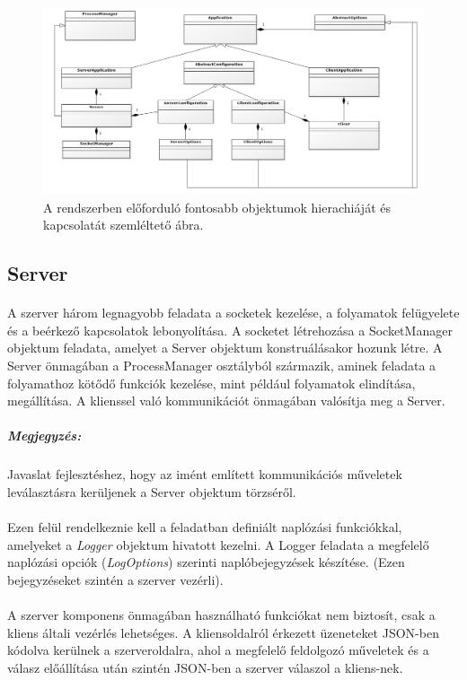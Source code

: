 \documentclass[12pt]{report}
\begin{document}
     \begin{figure}[ht]
    \includegraphics[width=16cm]{pics/classes.png}
	  \caption{A rendszerben előforduló fontosabb objektumok hierachiáját és kapcsolatát szemléltető ábra.}
  \end{figure}
\subsection{Server}
  \paragraph{}
  A szerver három legnagyobb feladata a socketek kezelése, a folyamatok felügyelete és a beérkező kapcsolatok lebonyolítása. A socketet létrehozása a SocketManager objektum feladata, amelyet a Server objektum konstruálásakor hozunk létre. A Server önmagában a ProcessManager osztályból származik, aminek feladata a folyamathoz kötődő funkciók kezelése, mint például folyamatok elindítása, megállítása. A klienssel való kommunikációt önmagában valósítja meg a Server.
  
  \subparagraph{Megjegyzés:}Javaslat fejlesztéshez, hogy az imént említett kommunikációs műveletek leválasztásra kerüljenek a Server objektum törzséről.
  \paragraph{}
Ezen felül rendelkeznie kell a feladatban definiált naplózási funkciókkal, amelyeket a \textit{Logger} objektum hivatott kezelni. A Logger feladata a megfelelő naplózási opciók (\textit{LogOptions}) szerinti naplóbejegyzések készítése. (Ezen bejegyzéseket szintén  a szerver vezérli).

\paragraph{}
  A szerver komponens önmagában használható funkciókat nem biztosít, csak a kliens általi vezérlés lehetséges. A kliensoldalról érkezett üzeneteket JSON-ben kódolva kerülnek a szerveroldalra, ahol a megfelelő feldolgozó műveletek és a válasz előállítása után szintén JSON-ben a szerver válaszol a kliens-nek.
  
\end{document}
